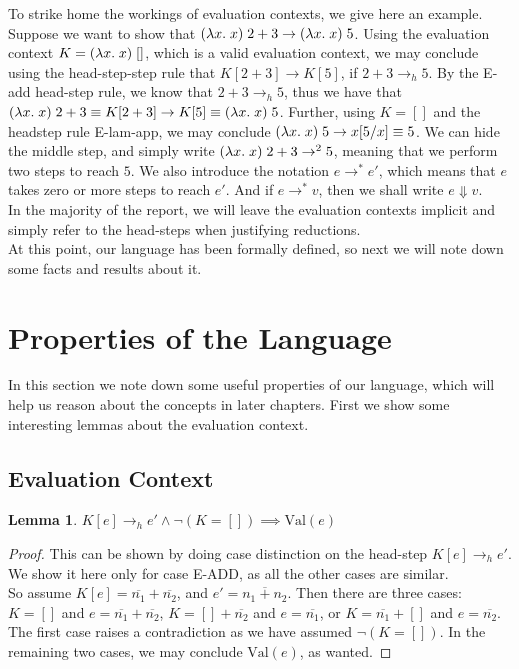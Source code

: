 \documentclass[a4paper, 11pt]{report}
\newtheorem{lemma}[theorem]{Lemma}
\theoremstyle{definition}
\newcommand{\var}{x}
\newcommand{\expr}{e}
\newcommand{\val}{v}
\newcommand{\Num}[1]{\overline{#1}}
\newcommand{\empelctx}{[]}
\newcommand{\elctx}{K}
\newcommand{\subst}[3]{#1{\left[#3 \middle/ #2 \right]}}
\newcommand{\step}{\rightarrow}
\newcommand{\stepS}{\rightarrow^*}
\newcommand{\hstep}{\rightarrow_h}
\newcommand{\Val}[1]{\mathrm{Val}(#1)}
\begin{document}
To strike home the workings of evaluation contexts, we give here an example. Suppose we want to show that $(\fun \var . \var) \; 2 + 3 \step (\fun \var . \var) \; 5$. Using the evaluation context $\elctx = (\fun \var . \var) \; \empelctx$, which is a valid evaluation context, we may conclude using the head-step-step rule that $\elctx[2 + 3] \step \elctx[5]$, if $2 + 3 \hstep 5$. By the E-add head-step rule, we know that $2 + 3 \hstep 5$, thus we have that $(\fun \var . \var) \; 2 + 3 \equiv \elctx[2 + 3] \step \elctx[5] \equiv (\fun \var . \var) \; 5$. Further, using $\elctx = \empelctx$ and the headstep rule E-lam-app, we may conclude $(\fun \var . \var) \; 5 \step \subst{\var}{\var}{5} \equiv 5$. We can hide the middle step, and simply write $(\fun \var . \var) \; 2 + 3 \step^2 5$, meaning that we perform two steps to reach $5$. We also introduce the notation $\expr \stepS \expr'$, which means that $\expr$ takes zero or more steps to reach $\expr'$. And if $\expr \stepS \val$, then we shall write $\expr \Downarrow \val$.\\
In the majority of the report, we will leave the evaluation contexts implicit and simply refer to the head-steps when justifying reductions.\medskip\\
At this point, our language has been formally defined, so next we will note down some facts and results about it.


\section{Properties of the Language}
In this section we note down some useful properties of our language, which will help us reason about the concepts in later chapters. First we show some interesting lemmas about the evaluation context.

\subsection{Evaluation Context}
\begin{lemma}\label{lem:headstep_val}
  $\elctx[\expr] \hstep \expr' \land \neg (\elctx = \empelctx) \implies \Val{e}$
\end{lemma}
\begin{proof}
  This can be shown by doing case distinction on the head-step $\elctx[\expr] \hstep \expr'$. We show it here only for case E-ADD, as all the other cases are similar. \medskip\\
  So assume $\elctx[\expr] = \Num{n_1} + \Num{n_2}$, and $\expr' = \Num{n_1 + n_2}$.
  Then there are three cases: $\elctx = []$ and $\expr = \Num{n_1} + \Num{n_2}$, $\elctx = [] + \Num{n_2}$ and $\expr = \Num{n_1}$, or $\elctx = \Num{n_1} + []$ and $\expr = \Num{n_2}$. The first case raises a contradiction as we have assumed $\neg (\elctx = \empelctx)$. In the remaining two cases, we may conclude $\Val{\expr}$, as wanted.
\end{proof}
\end{document}

